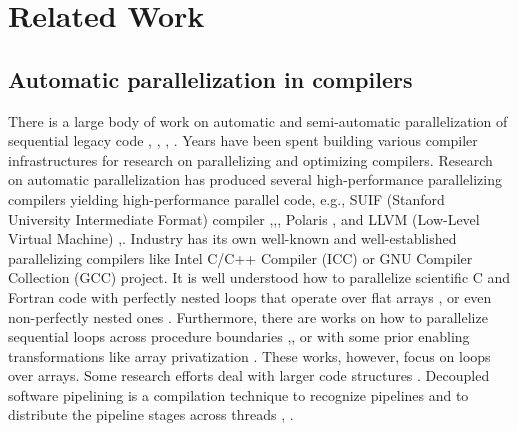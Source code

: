 \chapter{Related Work}
\label{related_work}
\quad 


\section{Automatic parallelization in compilers}
\label{related_work_autopar}
\quad There is a large body of work on automatic and semi-automatic parallelization of sequential legacy code \cite{6813266}, \cite{article12345}, \cite{Bacon:1994:CTH:197405.197406}, \cite{Kennedy:2001:OCM:502981}. Years have been spent building various compiler infrastructures for research on parallelizing \cite{Kennedy:2001:OCM:502981} and optimizing \cite{Muchnick:1998:ACD:286076} compilers. Research on automatic parallelization has produced several high-performance parallelizing compilers yielding high-performance parallel code, e.g., SUIF (Stanford University Intermediate Format) compiler \cite{546613},\cite{10.5555/891422},\cite{suif_compiler}, Polaris \cite{polaris}, \cite{10.1109/M-PDT.1994.329796} and LLVM (Low-Level Virtual Machine) \cite{llvm-compiler-infrastructure},\cite{Lattner:2004:LCF:977395.977673}. Industry has its own well-known and well-established parallelizing compilers like Intel C/C++ Compiler (ICC) \cite{icc-compiler} or GNU Compiler Collection (GCC) project.\newline\null
\quad It is well understood how to parallelize scientific C and Fortran code with perfectly nested loops that operate over flat arrays \cite{97902}, or even non-perfectly nested ones \cite{10.1145/263699.263719}. Furthermore, there are works on how to parallelize sequential loops across procedure boundaries \cite{10.1145/125826.126055},\cite{10.5555/645671.665383}, or with some prior enabling transformations like array privatization \cite{10.1145/158511.158515}. These works, however, focus on loops over arrays. Some research efforts deal with larger code structures
\cite{1299188}. Decoupled software pipelining is a compilation technique to recognize pipelines and to distribute the pipeline stages across threads \cite{1540952}, \cite{10.1145/1400112.1400113}.\newline\null
